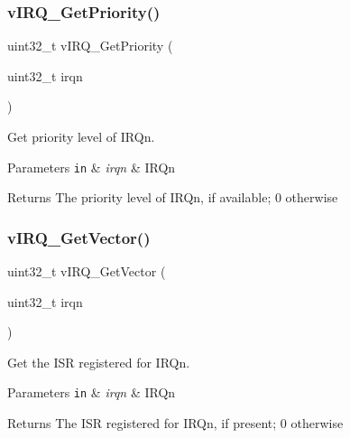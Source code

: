 \subsubsection{\texorpdfstring{v\+I\+R\+Q\+\_\+\+Get\+Priority()}{vIRQ\_GetPriority()}}
{\footnotesize\ttfamily uint32\+\_\+t v\+I\+R\+Q\+\_\+\+Get\+Priority (\begin{DoxyParamCaption}\item[{uint32\+\_\+t}]{irqn }\end{DoxyParamCaption})}



Get priority level of I\+R\+Qn. 


\begin{DoxyParams}[1]{Parameters}
\mbox{\tt in}  & {\em irqn} & I\+R\+Qn\\
\hline
\end{DoxyParams}
\begin{DoxyReturn}{Returns}
The priority level of I\+R\+Qn, if available; 0 otherwise 
\end{DoxyReturn}
\hypertarget{group__hypervisor_gaaa9c852e90077dd4c553240d769b3658}{}\label{group__hypervisor_gaaa9c852e90077dd4c553240d769b3658} 
\subsubsection{\texorpdfstring{v\+I\+R\+Q\+\_\+\+Get\+Vector()}{vIRQ\_GetVector()}}
{\footnotesize\ttfamily uint32\+\_\+t v\+I\+R\+Q\+\_\+\+Get\+Vector (\begin{DoxyParamCaption}\item[{uint32\+\_\+t}]{irqn }\end{DoxyParamCaption})}



Get the I\+SR registered for I\+R\+Qn. 


\begin{DoxyParams}[1]{Parameters}
\mbox{\tt in}  & {\em irqn} & I\+R\+Qn\\
\hline
\end{DoxyParams}
\begin{DoxyReturn}{Returns}
The I\+SR registered for I\+R\+Qn, if present; 0 otherwise 
\end{DoxyReturn}
\hypertarget{group__hypervisor_gab5570c2fa5a04a3a183cdef960a43c6b}{}\label{group__hypervisor_gab5570c2fa5a04a3a183cdef960a43c6b} 

